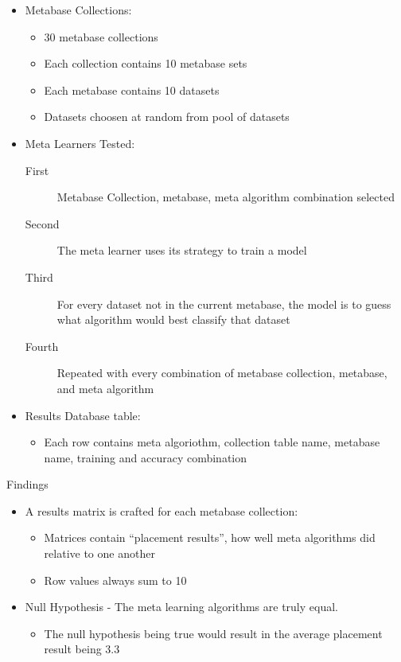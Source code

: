 \documentclass{beamer}
\begin{document}
\begin{frame}[t]
  \begin{itemize}
  \item Metabase Collections:
    \begin{itemize}
       \item 30 metabase collections
       \item Each collection contains 10 metabase sets
       \item Each metabase contains 10 datasets
       \item Datasets choosen at random from pool of datasets
    \end{itemize}
  \item Meta Learners Tested:
    \begin{description}
       \item[First] Metabase Collection, metabase, meta algorithm combination
                    selected
       \item[Second] The meta learner uses its strategy to train a model
       \item[Third] For every dataset not in the current metabase, the model is
                    to guess what algorithm would best classify that dataset
       \item[Fourth] Repeated with every combination of metabase collection,
                     metabase, and meta algorithm
    \end{description}
  \item Results Database table:
      \begin{itemize}
      \item Each row contains meta algoriothm, collection table name,
            metabase name, training and accuracy combination
      \end{itemize}
  \end{itemize}
\end{frame}

\begin{frame}{Findings}
  \begin{itemize}
     \item A results matrix is crafted for each metabase collection:
        \begin{itemize}
            \item Matrices contain ``placement results'', how well meta
                  algorithms did relative to one another
            \item Row values always sum to 10
        \end{itemize}
      \item Null Hypothesis - The meta learning algorithms are truly equal.
        \begin{itemize}
        \item The null hypothesis being true would result in the average
              placement result being 3.3
        \end{itemize}
  \end{itemize}
\end{frame}
\end{document}
